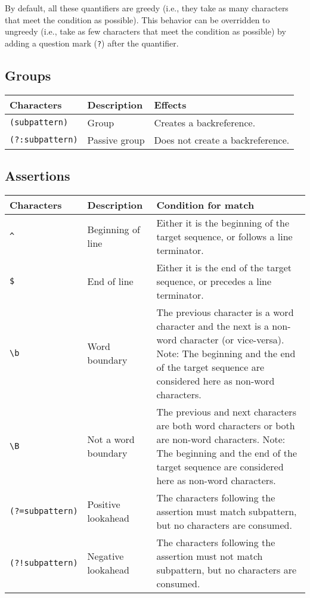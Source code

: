 By default, all these quantifiers are greedy (i.e., they take as many characters that meet the condition as possible). This behavior can be overridden to ungreedy (i.e., take as few characters that meet the condition as possible) by adding a question mark (\verb!?!) after the quantifier.

\subsection{Groups}
\begin{center}
	\begin{tabular}{|M{4cm}|M{3cm}|M{10cm}|}
		\hline
		Characters				&	Description		&	Effects\\
		\hline
		\verb!(subpattern)!		&	Group			&	Creates a backreference.\\
		\hline
		\verb!(?:subpattern)!	&	Passive group	&	Does not create a backreference.\\
		\hline
	\end{tabular}
\end{center}
\subsection{Assertions}
\begin{center}
	\begin{tabular}{|M{4cm}|M{3cm}|M{10cm}|}
		\hline
		Characters				&	Description			&	Condition for match\\
		\hline
		\verb!^!				&	Beginning of line	&	Either it is the beginning of the target sequence, or follows a line terminator.\\
		\hline
		\verb!$!				&	End of line			&	Either it is the end of the target sequence, or precedes a line terminator.\\
		\hline
		\verb!\b!				&	Word boundary		&	The previous character is a word character and the next is a non-word character (or vice-versa). Note: The beginning and the end of the target sequence are considered here as non-word characters.\\
		\hline
		\verb!\B!				&	Not a word boundary	&	The previous and next characters are both word characters or both are non-word characters. Note: The beginning and the end of the target sequence are considered here as non-word characters.\\
		\hline
		\verb!(?=subpattern)!	&	Positive lookahead	&	The characters following the assertion must match subpattern, but no characters are consumed.\\
		\hline
		\verb|(?!subpattern)|	&	Negative lookahead	&	The characters following the assertion must not match subpattern, but no characters are consumed.\\
		\hline
	\end{tabular}
\end{center}
